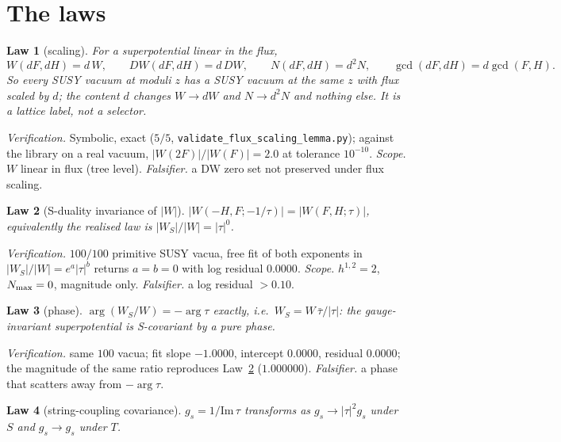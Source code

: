 \documentclass[11pt]{article}
\newtheorem{law}{Law}
\newcommand{\flux}{F}
\newcommand{\hh}{H}
\newcommand{\tauu}{\tau}
\begin{document}
\section{The laws}

\begin{law}[scaling]\label{law:scaling}
For a superpotential linear in the flux,
\begin{equation}
  W(d\flux,d\hh)=d\,W,\qquad DW(d\flux,d\hh)=d\,DW,\qquad
  N(d\flux,d\hh)=d^2 N,\qquad \gcd(d\flux,d\hh)=d\gcd(\flux,\hh).
\end{equation}
So every SUSY vacuum at moduli $z$ has a SUSY vacuum at the \emph{same} $z$ with flux
scaled by $d$; the content $d$ changes $W\to dW$ and $N\to d^2N$ and nothing else. It
is a lattice label, not a selector.
\end{law}

\textit{Verification.} Symbolic, exact ($5/5$, \texttt{validate\_flux\_scaling\_lemma.py});
against the library on a real vacuum, $|W(2\flux)|/|W(\flux)|=2.0$ at tolerance
$10^{-10}$. \textit{Scope.} $W$ linear in flux (tree level). \textit{Falsifier.} a DW
zero set not preserved under flux scaling.

\begin{law}[S-duality invariance of $|W|$]\label{law:mag}
$|W(-\hh,\flux;-1/\tauu)|=|W(\flux,\hh;\tauu)|$, equivalently the realised law is
$|W_S|/|W|=|\tauu|^0$.
\end{law}

\textit{Verification.} $100/100$ primitive SUSY vacua, free fit of both exponents in
$|W_S|/|W|=e^{a}|\tauu|^{b}$ returns $a=b=0$ with log residual $0.0000$. \textit{Scope.}
$h^{1,2}=2$, $N_{\rm max}=0$, magnitude only. \textit{Falsifier.} a log residual
$>0.10$.

\begin{law}[phase]\label{law:phase}
$\arg(W_S/W)=-\arg\tauu$ exactly, i.e.\ $W_S=W\,\bar\tauu/|\tauu|$: the gauge-invariant
superpotential is S-covariant by a pure phase.
\end{law}

\textit{Verification.} same $100$ vacua; fit slope $-1.0000$, intercept $0.0000$,
residual $0.0000$; the magnitude of the same ratio reproduces Law~\ref{law:mag}
($1.000000$). \textit{Falsifier.} a phase that scatters away from $-\arg\tauu$.

\begin{law}[string-coupling covariance]\label{law:gs}
$g_s=1/\mathrm{Im}\,\tauu$ transforms as $g_s\to|\tauu|^2 g_s$ under $S$ and
$g_s\to g_s$ under $T$.
\end{law}
\end{document}
